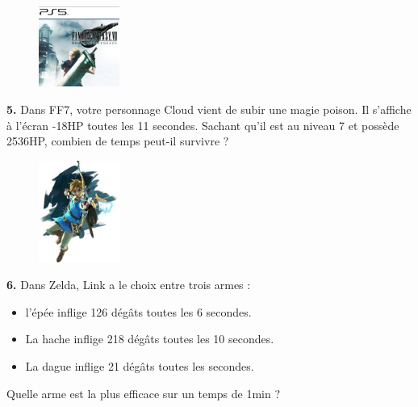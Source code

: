 \Pointilles[7]

\begin{minipage}[t]{0.25\textwidth}
  \begin{figure}[H]
    \centering
    \includegraphics[width=100px]{4x2-nombres-relatifs/ex2.jpg}
  \end{figure}
\end{minipage}
\begin{minipage}[t]{0.75\textwidth}
  \textbf{5.} Dans FF7, votre personnage Cloud vient de subir une magie poison. Il s'affiche à l'écran -18HP toutes les 11 secondes. Sachant qu'il est au niveau 7 et possède 2536HP, combien de temps peut-il survivre ?\\
  \Pointilles[6]
\end{minipage}

\Pointilles[3]

\begin{minipage}[t]{0.25\textwidth}
  \begin{figure}[H]
    \centering
    \includegraphics[width=100px]{4x2-nombres-relatifs/ex3.jpg}
  \end{figure}
\end{minipage}
\begin{minipage}[t]{0.75\textwidth}
  \textbf{6.} Dans Zelda, Link a le choix entre trois armes : 
  \begin{itemize}
    \item l'épée inflige 126 dégâts toutes les 6 secondes.
    \item La hache inflige 218 dégâts toutes les 10 secondes.
    \item La dague inflige 21 dégâts toutes les secondes.
  \end{itemize}
  Quelle arme est la plus efficace sur un temps de 1min ?\\
  \Pointilles[5]
\end{minipage}

\Pointilles[3]

